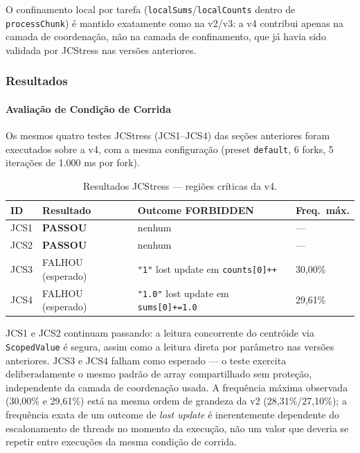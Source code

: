 O confinamento local por tarefa (\texttt{localSums}/\texttt{localCounts}
dentro de \texttt{processChunk}) é mantido exatamente como na v2/v3: a
v4 contribui apenas na camada de coordenação, não na camada de
confinamento, que já havia sido validada por JCStress nas versões
anteriores.

\subsubsection{Resultados}

\paragraph{Avaliação de Condição de Corrida}

Os mesmos quatro testes JCStress (JCS1--JCS4) das seções anteriores
foram executados sobre a v4, com a mesma configuração (preset
\texttt{default}, 6 forks, 5 iterações de 1.000 ms por fork).

\begin{table}[H]
\centering
\begin{tabular}{llll}
\hline
\textbf{ID} & \textbf{Resultado} & \textbf{Outcome FORBIDDEN} & \textbf{Freq.\ máx.} \\
\hline
JCS1 & \textbf{PASSOU}            & nenhum                   & ---      \\
JCS2 & \textbf{PASSOU}            & nenhum                   & ---      \\
JCS3 & FALHOU (esperado) & \texttt{"1"} lost update em \texttt{counts[0]++}  & 30,00\% \\
JCS4 & FALHOU (esperado) & \texttt{"1.0"} lost update em \texttt{sums[0]+=1.0} & 29,61\% \\
\hline
\end{tabular}
\caption{Resultados JCStress --- regiões críticas da v4.}
\label{tab:jcstress-v4}
\end{table}

JCS1 e JCS2 continuam passando: a leitura concorrente do centróide via
\texttt{ScopedValue} é segura, assim como a leitura direta por parâmetro
nas versões anteriores. JCS3 e JCS4 falham como esperado --- o teste
exercita deliberadamente o mesmo padrão de array compartilhado sem
proteção, independente da camada de coordenação usada. A frequência
máxima observada (30,00\% e 29,61\%) está na mesma ordem de grandeza da
v2 (28,31\%/27,10\%); a frequência exata de um outcome de \textit{lost
update} é inerentemente dependente do escalonamento de threads no
momento da execução, não um valor que deveria se repetir entre execuções
da mesma condição de corrida.


